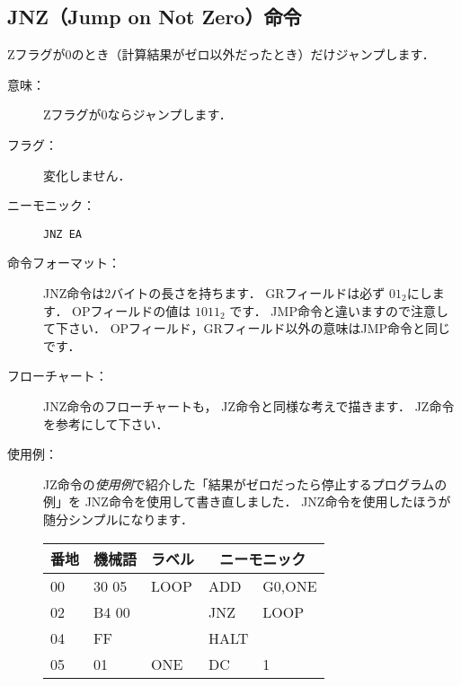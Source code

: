 \subsection{JNZ（Jump on Not Zero）命令}
Zフラグが0のとき（計算結果がゼロ以外だったとき）だけジャンプします．

\begin{description}
\item[意味：]Zフラグが0ならジャンプします．

\item[フラグ：]変化しません．

\item[ニーモニック：]\texttt{JNZ  EA} 

\item[命令フォーマット：]JNZ命令は2バイトの長さを持ちます．
  GRフィールドは必ず $01_2$にします．
  OPフィールドの値は $1011_2$ です．
  JMP命令と違いますので注意して下さい．
  OPフィールド，GRフィールド以外の意味はJMP命令と同じです．


\item[フローチャート：]JNZ命令のフローチャートも，
  JZ命令と同様な考えで描きます．
  JZ命令を参考にして下さい．

\item[使用例：]
  JZ命令の\emph{使用例}で紹介した「結果がゼロだったら停止するプログラムの例」を
  JNZ命令を使用して書き直しました．
  JNZ命令を使用したほうが随分シンプルになります．

  {\ttfamily\small\begin{center}
    \begin{tabular}{|l|l|l|l l|} \hline
      番地 & 機械語 & ラベル & \multicolumn{2}{|c|}{ニーモニック} \\
      \hline
      00 & 30 05 & LOOP & ADD  & G0,ONE  \\
      02 & B4 00 &      & JNZ  & LOOP    \\
      04 & FF    &      & HALT &         \\
      05 & 01    & ONE  & DC   & 1       \\
      \hline
    \end{tabular}
  \end{center}}
\end{description}

